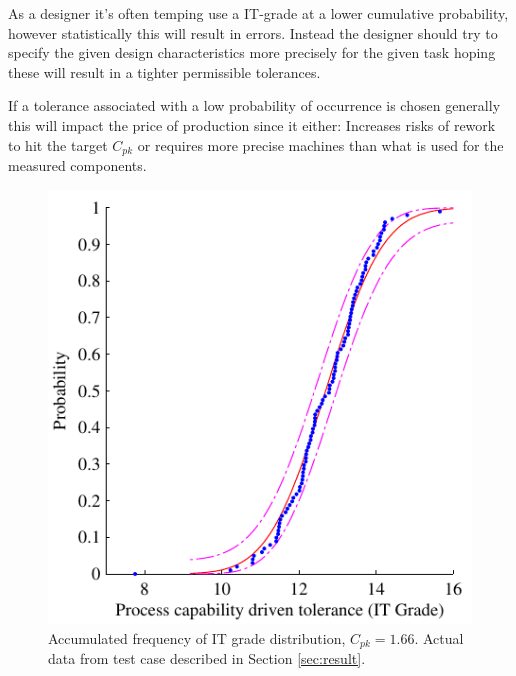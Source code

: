 \documentclass[aip,amsmath, reprint, author-year]{revtex4-1}
\begin{document}
As a designer it's often temping use a IT-grade at a lower cumulative probability, however statistically this will result in errors. Instead the designer should try to specify the given design characteristics more precisely for the given task hoping these will result in a tighter permissible tolerances.

If a tolerance associated with a low probability of occurrence is chosen generally this will impact the price of production since it either: 
Increases risks of rework to hit the target $C_{pk}$ or requires more precise machines than what is used for the measured components.

\begin{figure}
\includegraphics{ITG_total.pdf}
\caption{\label{fig:acumfreq} Accumulated frequency of IT grade distribution, $C_{pk} =1.66$. 
Actual data from test case described in Section \ref{sec:result}. }
\end{figure}
\end{document}
